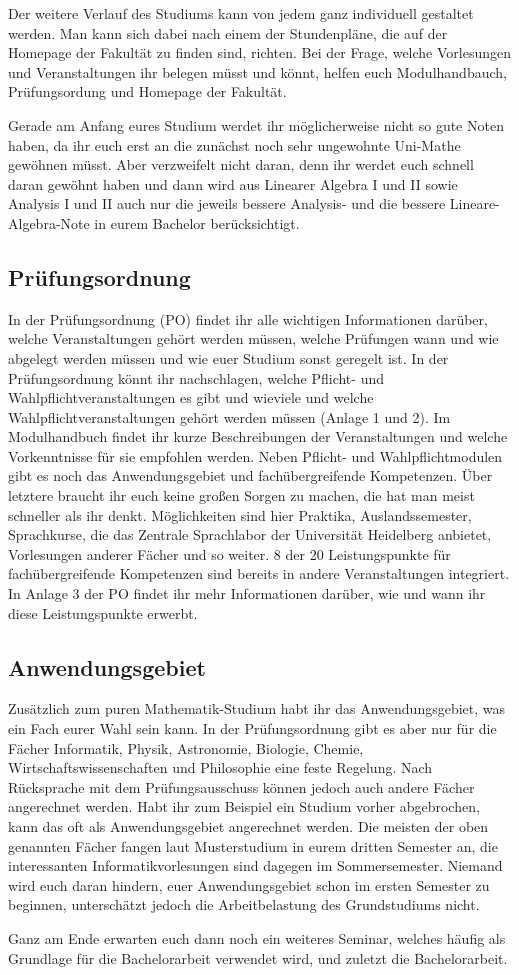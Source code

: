 Der weitere Verlauf des Studiums kann von jedem ganz individuell gestaltet
werden.  Man kann sich dabei nach einem der Stundenpläne, die auf der Homepage
der Fakultät zu finden sind, richten. Bei der Frage, welche Vorlesungen und
Veranstaltungen ihr belegen müsst und könnt, helfen euch Modulhandbauch,
Prüfungsordung und Homepage der Fakultät.

Gerade am Anfang eures Studium werdet ihr möglicherweise nicht so gute Noten
haben, da ihr euch erst an die zunächst noch sehr ungewohnte Uni-Mathe gewöhnen
müsst. Aber verzweifelt nicht daran, denn ihr werdet euch schnell daran gewöhnt
haben und dann wird aus Linearer Algebra I und II sowie Analysis I und II  auch
nur die jeweils bessere Analysis- und die bessere Lineare-Algebra-Note in eurem
Bachelor berücksichtigt.

\subsection{Prüfungsordnung}

In der Prüfungsordnung (PO) findet ihr alle wichtigen Informationen darüber,
welche Veranstaltungen gehört werden müssen, welche Prüfungen wann und wie
abgelegt werden müssen und wie euer Studium sonst geregelt ist.  In der
Prüfungsordnung könnt ihr nachschlagen, welche Pflicht- und
Wahlpflichtveranstaltungen es gibt und wieviele und welche
Wahlpflichtveranstaltungen gehört werden müssen (Anlage 1 und 2).  Im
Modulhandbuch findet ihr kurze Beschreibungen der Veranstaltungen und welche
Vorkenntnisse für sie empfohlen werden.  Neben Pflicht- und Wahlpflichtmodulen
gibt es noch das Anwendungsgebiet und fachübergreifende Kompetenzen.  Über
letztere braucht ihr euch keine großen Sorgen zu machen, die hat man meist
schneller als ihr denkt. Möglichkeiten sind hier Praktika, Auslandssemester,
Sprachkurse, die das Zentrale Sprachlabor der Universität Heidelberg anbietet,
Vorlesungen anderer Fächer und so weiter. 8 der 20 Leistungspunkte für
fachübergreifende Kompetenzen sind bereits in andere Veranstaltungen
integriert.  In Anlage 3 der PO findet ihr mehr Informationen darüber, wie und
wann ihr diese Leistungspunkte erwerbt.


\subsection{Anwendungsgebiet}

Zusätzlich zum puren Mathematik-Studium habt ihr das Anwendungsgebiet, was ein
Fach eurer Wahl sein kann.  In der Prüfungsordnung gibt es aber nur für die
Fächer Informatik, Physik, Astronomie, Biologie, Chemie,
Wirtschaftswissenschaften und Philosophie eine feste Regelung. Nach Rücksprache
mit dem Prüfungsausschuss können jedoch auch andere Fächer angerechnet werden.
Habt ihr zum Beispiel ein Studium vorher abgebrochen, kann das oft als
Anwendungsgebiet angerechnet werden.  Die meisten der oben genannten Fächer
fangen laut Musterstudium in eurem dritten Semester an, die interessanten
Informatikvorlesungen sind dagegen im Sommersemester.  Niemand wird euch daran
hindern, euer Anwendungsgebiet schon im ersten Semester zu beginnen,
unterschätzt jedoch die Arbeitbelastung des Grundstudiums nicht.

Ganz am Ende erwarten euch dann noch ein weiteres Seminar, welches häufig als
Grundlage für die Bachelorarbeit verwendet wird, und zuletzt die Bachelorarbeit.
